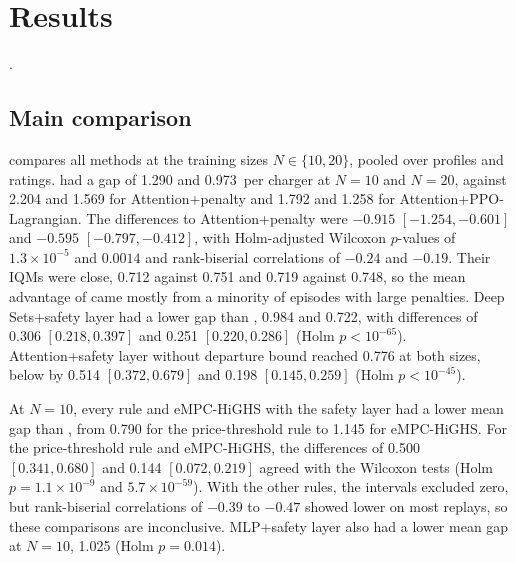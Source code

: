 \section{Results}\label{sec:results}

.

\subsection{Main comparison}\label{sec:res-main}

 compares all methods at the training sizes $N\in\{10,20\}$, pooled over profiles and ratings.
\method{} had a gap of 1.290 and 0.973\,\texteuro{} per charger at $N=10$ and $N=20$, against 2.204 and 1.569 for Attention+penalty and 1.792 and 1.258 for Attention+PPO-Lagrangian.
The differences to Attention+penalty were $-0.915$ $[-1.254,-0.601]$ and $-0.595$ $[-0.797,-0.412]$, with Holm-adjusted Wilcoxon $p$-values of $1.3\times10^{-5}$ and $0.0014$ and rank-biserial correlations of $-0.24$ and $-0.19$.
Their IQMs were close, 0.712 against 0.751 and 0.719 against 0.748, so the mean advantage of \method{} came mostly from a minority of episodes with large penalties.
Deep Sets+safety layer had a lower gap than \method{}, 0.984 and 0.722, with differences of 0.306 $[0.218,0.397]$ and 0.251 $[0.220,0.286]$ (Holm $p<10^{-65}$).
Attention+safety layer without departure bound reached 0.776 at both sizes, below \method{} by 0.514 $[0.372,0.679]$ and 0.198 $[0.145,0.259]$ (Holm $p<10^{-45}$).

At $N=10$, every rule and eMPC-HiGHS with the safety layer had a lower mean gap than \method{}, from 0.790 for the price-threshold rule to 1.145 for eMPC-HiGHS.
For the price-threshold rule and eMPC-HiGHS, the differences of 0.500 $[0.341,0.680]$ and 0.144 $[0.072,0.219]$ agreed with the Wilcoxon tests (Holm $p=1.1\times10^{-9}$ and $5.7\times10^{-59}$).
With the other rules, the intervals excluded zero, but rank-biserial correlations of $-0.39$ to $-0.47$ showed \method{} lower on most replays, so these comparisons are inconclusive.
MLP+safety layer also had a lower mean gap at $N=10$, 1.025 (Holm $p=0.014$).

